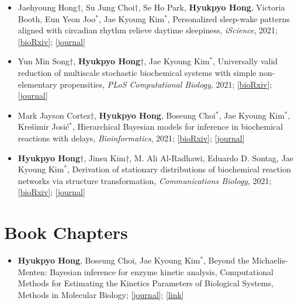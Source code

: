 \documentclass[margin,line]{res}
\newcommand{\vspacesection}{\vspace*{-1.5mm}}
\begin{document}
\begin{resume}
\begin{itemize}[leftmargin=*]
    \item[4.] Jaehyoung Hong$\dagger$, Su Jung Choi$\dagger$, Se Ho Park, \textbf{Hyukpyo Hong}, Victoria Booth, Eun Yeon Joo${}^*$, Jae Kyoung Kim${}^*$, Personalized sleep-wake patterns aligned with circadian rhythm relieve daytime sleepiness, \textit{iScience}, 2021; [\href{https://doi.org/10.1101/2021.03.15.435366}{\ul{bioRxiv}}]; [\href{https://doi.org/10.1016/j.isci.2021.103129}{\ul{journal}}]

    \item[3.] Yun Min Song$\dagger$, \textbf{Hyukpyo Hong}$\dagger$, Jae Kyoung Kim${}^*$, Universally valid reduction of multiscale stochastic biochemical systems with simple non-elementary propensities, \textit{PLoS Computational Biology}, 2021; [\href{https://doi.org/10.1101/2021.04.08.438974}{\ul{bioRxiv}}]; [\href{https://doi.org/10.1371/journal.pcbi.1008952}{\ul{journal}}]

    \item[2.] Mark Jayson Cortez$\dagger$, \textbf{Hyukpyo Hong}, Boseung Choi${}^*$, Jae Kyoung Kim${}^*$, Krešimir Josić${}^*$, Hierarchical Bayesian models for inference in biochemical reactions with delays, \textit{Bioinformatics}, 2021; [\href{https://doi.org/10.1101/2021.08.16.456485}{\ul{bioRxiv}}]; [\href{https://doi.org/10.1093/bioinformatics/btab618}{\ul{journal}}]

    \item[1.] \textbf{Hyukpyo Hong}$\dagger$, Jinsu Kim$\dagger$, M. Ali Al-Radhawi, Eduardo D. Sontag, Jae Kyoung Kim${}^*$, Derivation of stationary distributions of biochemical reaction networks via structure transformation, \textit{Communications Biology}, 2021; [\href{https://doi.org/10.1101/2021.03.23.436681}{\ul{bioRxiv}}]; [\href{https://www.nature.com/articles/s42003-021-02117-x}{\ul{journal}}]

\end{itemize}
\vspacesection
\section{\sc Book Chapters}
\begin{itemize}[leftmargin=*]
    \item[1.] \textbf{Hyukpyo Hong}, Boseung Choi, Jae Kyoung Kim${}^*$, Beyond the Michaelis-Menten: Bayesian inference for enzyme kinetic analysis, Computational Methods for Estimating the Kinetics Parameters of Biological Systems, Methods in Molecular Biology; [\href{https://doi.org/10.1007/978-1-0716-1767-0_3}{\ul{journal}}]; [\href{https://www.springer.com/gp/book/9781071617663}{\ul{link}}]
\end{itemize}

\end{resume}
\end{document}
